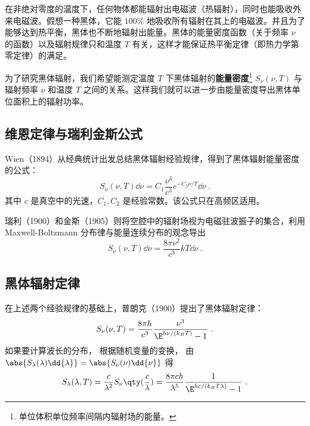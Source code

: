 
在非绝对零度的温度下，任何物体都能辐射出电磁波（热辐射），同时也能吸收外来电磁波。假想一种黑体，它能 $100\%$ 地吸收所有辐射在其上的电磁波。并且为了能够达到热平衡，黑体也不断地辐射出能量。黑体的能量密度函数（关于频率 $\nu$ 的函数）以及辐射规律只和温度 $T$ 有关，这样才能保证热平衡定律（即热力学第零定律）的满足。

为了研究黑体辐射，我们希望能测定温度 $T$ 下黑体辐射的\textbf{能量密度}\footnote{单位体积单位频率间隔内辐射场的能量。} $S_\nu(\nu,T)$ 与辐射频率 $\nu$ 和温度 $T$ 之间的关系。这样我们就可以进一步由能量密度导出黑体单位面积上的辐射功率。

\subsection{维恩定律与瑞利金斯公式}
Wien（1894）从经典统计出发总结黑体辐射经验规律，得到了黑体辐射能量密度的公式：
\begin{equation}
S_\nu(\nu,T)\dd \nu=C_1 \frac{\nu^3}{c^3}e^{-C_2\nu/T}\dd \nu~.
\end{equation}
其中 $c$ 是真空中的光速，$C_1,C_2$ 是经验常数。该公式只在高频区适用。

瑞利（1900）和金斯（1905）则将空腔中的辐射场视为电磁驻波振子的集合，利用 Maxwell-Boltzmann 分布律与能量连续分布的观念导出
\begin{equation}
S_\nu(\nu,T)\dd \nu=\frac{8\pi\nu^2}{c^3}kT\dd \nu~.
\end{equation}


\subsection{黑体辐射定律}
在上述两个经验规律的基础上，普朗克（1900）提出了黑体辐射定律：
\begin{equation}
S_\nu(\nu,T) = \frac{8\pi h}{c^3}\frac{\nu^3}{\E^{h\nu/(k_B T)} - 1}~.
\end{equation}
如果要计算波长的分布， 根据随机变量的变换， 由 $\abs{S_\lambda(\lambda) \dd{\lambda}} = \abs{S_\nu(\nu)\dd{\nu}}$ 得
\begin{equation}\label{eq_BBdLaw_1}
S_\lambda(\lambda,T) = \frac{c}{\lambda^2}S_\nu\qty(\frac{c}{\lambda}) =
\frac{8\pi ch}{\lambda^5} \frac{1}{\E^{hc/(k_B T\lambda)} - 1}~.
\end{equation}


